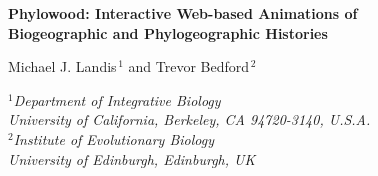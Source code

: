 \documentclass[11pt]{article}
\begin{document}


\begin{titlepage}
\begin{center}
{\Large\bf Phylowood: Interactive Web-based Animations of \\ Biogeographic and Phylogeographic Histories}

\bigskip

{\sc Michael J. Landis$^{\,1}$ and Trevor Bedford$^{\,2}$} \\

\bigskip

{\em
$\mbox{}^1$Department of Integrative Biology\\
\vspace{-0.4\baselineskip}
University of California, Berkeley, CA 94720-3140, \mbox{U.S.A.} \\

$\mbox{}^2$Institute of Evolutionary Biology\\
\vspace{-0.4\baselineskip}
University of Edinburgh, Edinburgh, UK \\
}
\end{center}

\bigskip

\begin{abstract}

 Phylowood is a web service that uses Javascript to generate in-browser animations of biogeographic and phylogeographic histories from annotated phylogenetic input. The animations are interactive, allowing the user to adjust spatial and temporal resolution, and highlight phylogenetic lineages of interest.

 All documentation and source code for Phylowood is freely available at \\
\url{https://github.com/mlandis/phylowood} and a live web application is available at \\
\url{https://mlandis.github.io/phylowood}.

 mlandis@berkeley.edu

\end{abstract}

\end{titlepage}

\end{document}
